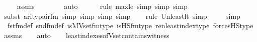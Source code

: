 \begin{isabellebody}
\ \ \isamarkupfalse%
\ assms\isanewline
\ \ \ \ \ \ \isamarkupfalse%
\ auto{\isacharbrackleft}{\kern0pt}{}{\isacharbrackright}{\kern0pt}\isanewline
\ \ \ \ \ \isamarkupfalse%
{\isacharparenleft}{\kern0pt}rule\ max{\isacharunderscore}{\kern0pt}le{}{\isacharcomma}{\kern0pt}\ simp{\isacharcomma}{\kern0pt}\ simp{\isacharcomma}{\kern0pt}\ simp{\isacharparenright}{\kern0pt}\isanewline
\ \ \ \isamarkupfalse%
{\isacharparenleft}{\kern0pt}subst\ arity{\isacharunderscore}{\kern0pt}pair{\isacharunderscore}{\kern0pt}fm{\isacharcomma}{\kern0pt}\ simp{\isacharcomma}{\kern0pt}\ simp{\isacharcomma}{\kern0pt}\ simp{\isacharcomma}{\kern0pt}\ simp{\isacharparenright}{\kern0pt}\isanewline
\ \ \ \isamarkupfalse%
{\isacharparenleft}{\kern0pt}rule\ Un{\isacharunderscore}{\kern0pt}least{\isacharunderscore}{\kern0pt}lt{\isacharcomma}{\kern0pt}\ simp{\isacharparenright}{\kern0pt}{\isacharplus}{\kern0pt}\isanewline
\ \ \ \isamarkupfalse%
\ simp\isanewline
\ \ \isamarkupfalse%
\ fst{\isacharunderscore}{\kern0pt}fm{\isacharunderscore}{\kern0pt}def\ snd{\isacharunderscore}{\kern0pt}fm{\isacharunderscore}{\kern0pt}def\ is{\isacharunderscore}{\kern0pt}MVset{\isacharunderscore}{\kern0pt}fm{\isacharunderscore}{\kern0pt}type\ is{\isacharunderscore}{\kern0pt}HS{\isacharunderscore}{\kern0pt}fm{\isacharunderscore}{\kern0pt}type\ ren{\isacharunderscore}{\kern0pt}least{\isacharunderscore}{\kern0pt}index{\isacharunderscore}{\kern0pt}type\ forcesHS{\isacharunderscore}{\kern0pt}type\ assms\isanewline
\ \ \isamarkupfalse%
\ auto\isanewline
\ \ \isamarkupfalse%
%
\endisatagproof
{\isafoldproof}%
%
\isadelimproof
\isanewline
%
\endisadelimproof
\isanewline
{}\isamarkupfalse%
\ least{\isacharunderscore}{\kern0pt}indexes{\isacharunderscore}{\kern0pt}of{\isacharunderscore}{\kern0pt}Vset{\isacharunderscore}{\kern0pt}contains{\isacharunderscore}{\kern0pt}witness\ \ \isanewline

\end{isabellebody}
